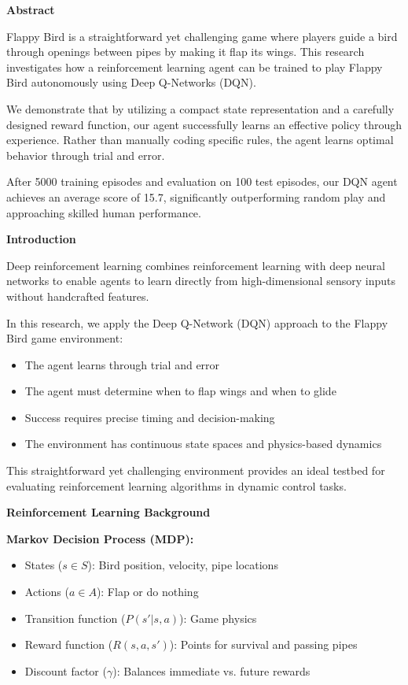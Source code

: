 \documentclass[a1paper,portrait]{article}
\newcommand{\postersection}[1]{
  \vspace{0.5cm}
  \noindent\textcolor{headerblue}{\Large\textbf{#1}}
  \vspace{0.3cm}
}
\begin{document}
\begin{multicols}{3}

\postersection{Abstract}
Flappy Bird is a straightforward yet challenging game where players guide a bird through openings between pipes by making it flap its wings. This research investigates how a reinforcement learning agent can be trained to play Flappy Bird autonomously using Deep Q-Networks (DQN).

We demonstrate that by utilizing a compact state representation and a carefully designed reward function, our agent successfully learns an effective policy through experience. Rather than manually coding specific rules, the agent learns optimal behavior through trial and error.

After 5000 training episodes and evaluation on 100 test episodes, our DQN agent achieves an average score of 15.7, significantly outperforming random play and approaching skilled human performance.

\postersection{Introduction}
Deep reinforcement learning combines reinforcement learning with deep neural networks to enable agents to learn directly from high-dimensional sensory inputs without handcrafted features.

In this research, we apply the Deep Q-Network (DQN) approach to the Flappy Bird game environment:
\begin{itemize}
    \item The agent learns through trial and error
    \item The agent must determine when to flap wings and when to glide
    \item Success requires precise timing and decision-making
    \item The environment has continuous state spaces and physics-based dynamics
\end{itemize}

This straightforward yet challenging environment provides an ideal testbed for evaluating reinforcement learning algorithms in dynamic control tasks.

\postersection{Reinforcement Learning Background}
\textbf{Markov Decision Process (MDP):}
\begin{itemize}
    \item States ($s \in S$): Bird position, velocity, pipe locations
    \item Actions ($a \in A$): Flap or do nothing
    \item Transition function ($P(s'|s,a)$): Game physics
    \item Reward function ($R(s,a,s')$): Points for survival and passing pipes
    \item Discount factor ($\gamma$): Balances immediate vs. future rewards
\end{itemize}


\end{multicols}
\end{document}
